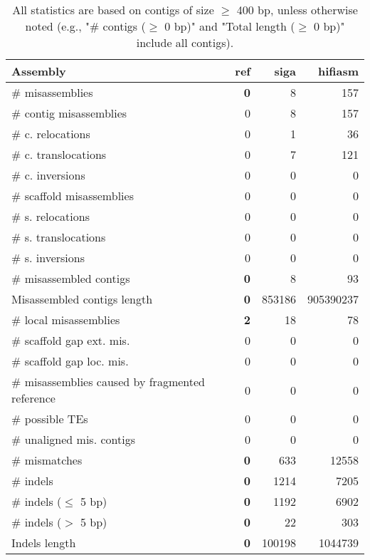 \documentclass[12pt,a4paper]{article}
\begin{document}
\begin{table}[ht]
\begin{center}
\caption{All statistics are based on contigs of size $\geq$ 400 bp, unless otherwise noted (e.g., "\# contigs ($\geq$ 0 bp)" and "Total length ($\geq$ 0 bp)" include all contigs).}
\begin{tabular}{|l*{3}{|r}|}
\hline
Assembly & ref & siga & hifiasm \\ \hline
\# misassemblies & {\bf 0} & 8 & 157 \\ \hline
\hspace{2mm}\# contig misassemblies & 0 & 8 & 157 \\ \hline
\hspace{5mm}\# c. relocations & 0 & 1 & 36 \\ \hline
\hspace{5mm}\# c. translocations & 0 & 7 & 121 \\ \hline
\hspace{5mm}\# c. inversions & 0 & 0 & 0 \\ \hline
\hspace{2mm}\# scaffold misassemblies & 0 & 0 & 0 \\ \hline
\hspace{5mm}\# s. relocations & 0 & 0 & 0 \\ \hline
\hspace{5mm}\# s. translocations & 0 & 0 & 0 \\ \hline
\hspace{5mm}\# s. inversions & 0 & 0 & 0 \\ \hline
\# misassembled contigs & {\bf 0} & 8 & 93 \\ \hline
Misassembled contigs length & {\bf 0} & 853186 & 905390237 \\ \hline
\# local misassemblies & {\bf 2} & 18 & 78 \\ \hline
\# scaffold gap ext. mis. & 0 & 0 & 0 \\ \hline
\# scaffold gap loc. mis. & 0 & 0 & 0 \\ \hline
\# misassemblies caused by fragmented reference & 0 & 0 & 0 \\ \hline
\# possible TEs & 0 & 0 & 0 \\ \hline
\# unaligned mis. contigs & 0 & 0 & 0 \\ \hline
\# mismatches & {\bf 0} & 633 & 12558 \\ \hline
\# indels & {\bf 0} & 1214 & 7205 \\ \hline
\hspace{5mm}\# indels ($\leq$ 5 bp) & {\bf 0} & 1192 & 6902 \\ \hline
\hspace{5mm}\# indels ($>$ 5 bp) & {\bf 0} & 22 & 303 \\ \hline
Indels length & {\bf 0} & 100198 & 1044739 \\ \hline
\end{tabular}
\end{center}
\end{table}
\end{document}
